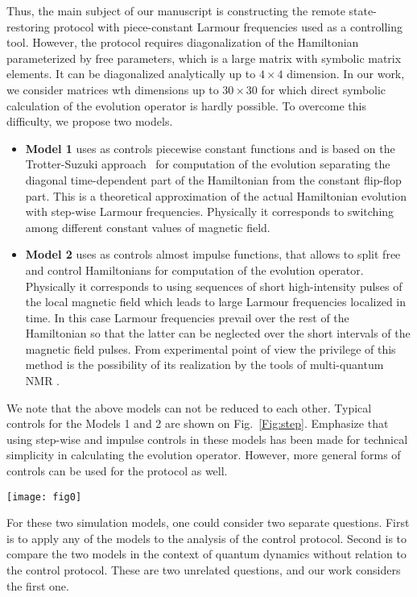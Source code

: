 \documentclass[pra,preprint,showpacs]{revtex4-1}
\begin{document}
{ Thus, the main subject of our manuscript is constructing the remote state-restoring protocol with piece-constant Larmour frequencies used as a controlling tool.}
However, the protocol requires diagonalization of the Hamiltonian parameterized by free parameters, { which is a large matrix with symbolic matrix elements. It can be diagonalized analytically up to $4\times 4$ dimension. In our work, we consider matrices wth dimensions up to $30\times 30$ for which direct symbolic calculation of the evolution operator is hardly possible.} To overcome this difficulty, we propose two models.
\begin{itemize}
\item[---]
{\bf Model 1} {{uses as controls piecewise constant functions} and is based on the
Trotter-Suzuki approach~\cite{Trotter,Suzuki} for computation of the evolution separating the diagonal time-dependent part of the Hamiltonian
from the constant flip-flop part. This is a theoretical approximation of the actual Hamiltonian evolution with step-wise Larmour frequencies. Physically it corresponds to switching among different constant values of magnetic field.}
\item[---]
{\bf Model 2} {uses as controls almost impulse functions, that allows to split free and control Hamiltonians for computation of the evolution operator. Physically it corresponds to using sequences of short high-intensity  pulses of the local magnetic field which leads to large Larmour frequencies localized in time. In this case Larmour frequencies prevail over the rest of the Hamiltonian  so that the latter can be neglected over the short intervals of the magnetic field pulses. From experimental point of view the privilege of this method is the possibility of its realization by the tools of multi-quantum NMR \cite{Baum}}.
\end{itemize}
{ We note that the above models can not be reduced  to each other. Typical controls for the Models 1 and 2 are shown on Fig.~\ref{Fig:step}.  Emphasize that using step-wise and impulse controls in these models has been made for technical simplicity in calculating the evolution operator. However, more general forms of controls can be used for the protocol as well.

\begin{figure*}[!]
\centering
\texttt{[image: fig0]}
\caption{{ Typical examples of time evolution of the controls $\omega_j$ ($\tau$ is some rescaled time defined below): (a) for Model 1, where $\omega_j$ is constant over each interval $\Delta\tau$; (b) for Model 2, where each interval $\Delta\tau$ is divided in long subinterval $\Delta\tau^{(1)}$ with zero control magnetic field and short subinterval  $\Delta\tau^{(2)}$ with sufficiently strong magnetic field.}}
\label{Fig:step}
\end{figure*}

For these two simulation models, one could consider two separate questions. First is to apply any of the models to the analysis of the control protocol. Second is to compare the two models in the context of quantum dynamics without relation to the control protocol. These are two unrelated questions, and our work considers the first one.}
\end{document}
